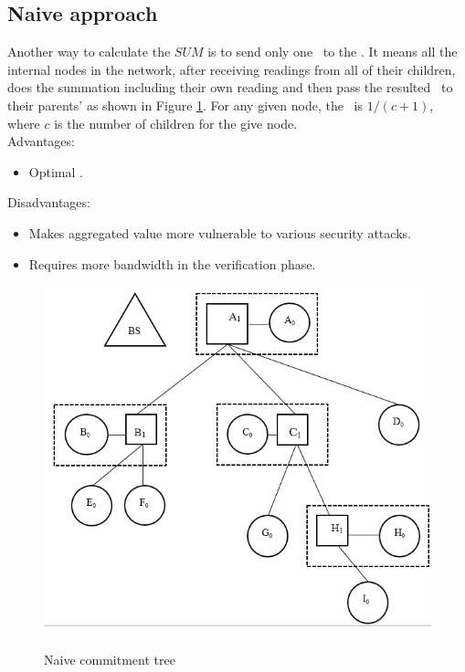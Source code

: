 	\subsection{Naive approach}
		Another way to calculate the $SUM$ is to send only one \payload\ to the \bs.
		It means all the internal nodes in the network, after receiving readings from all of their children, does the summation including their own reading and then pass the resulted \payload\ to their parents' as shown in Figure \ref{fig:naive-commitment-tree}.
		For any given node, the \inforate\ is $1 / (c + 1)$, where $c$ is the number of children for the give node.\\
		Advantages:
			\begin{itemize}
				\item Optimal \inforate.
			\end{itemize}
		Disadvantages:
			\begin{itemize}
				\item Makes aggregated value more vulnerable to various security attacks.
				\item Requires more bandwidth in the verification phase.
			\end{itemize}
		\begin{figure}[hp]
			\centering
			\includegraphics[scale = 0.6]{images/naive-commitment-tree.png}\\
			\caption{Naive commitment tree}
			\label{fig:naive-commitment-tree}
		\end{figure}

